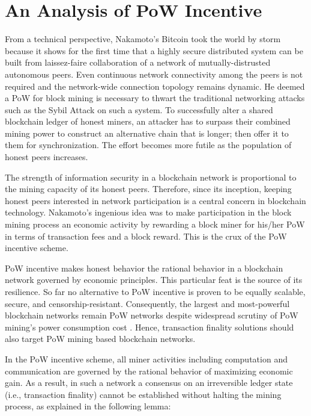 \section{An Analysis of PoW Incentive}
\label{s-incentive}
From a technical perspective, Nakamoto's Bitcoin \cite{bitcoin} took the world by storm because it shows for the first time that a highly secure distributed system can be built from laissez-faire collaboration of a network of mutually-distrusted autonomous peers. Even continuous network connectivity among the peers is not required and the network-wide connection topology remains dynamic. He deemed a PoW for block mining is necessary to thwart the traditional networking attacks such as the Sybil Attack \cite{Douceur:2002:SA:646334.687813} on such a system. To successfully alter a shared blockchain ledger of honest miners, an attacker has to surpass their combined mining power to construct an alternative chain that is longer; then offer it to them for synchronization. The effort becomes more futile as the population of honest peers increases.

The strength of information security in a blockchain network is proportional to the mining capacity of its honest peers. Therefore, since its inception, keeping honest peers interested in network participation is a central concern in blockchain technology. Nakamoto's ingenious idea was to make participation in the block mining process an economic activity \cite{Kroll2013TheEO} by rewarding a block miner for his/her PoW in terms of transaction fees and a block reward. This is the crux of the PoW incentive scheme.

PoW incentive makes honest behavior the rational behavior \cite{bitcoin} in a blockchain network governed by economic principles. This particular feat is the source of its resilience. So far no alternative to PoW incentive is proven to be equally scalable, secure, and censorship-resistant. Consequently, the largest and most-powerful blockchain networks remain PoW networks despite widespread scrutiny of PoW mining's power consumption cost \cite{powcost}. Hence, transaction finality solutions should also target PoW mining based blockchain networks.

In the PoW incentive scheme, all miner activities including computation and communication are governed by the rational behavior of maximizing economic gain. As a result, in such a network a consensus on an irreversible ledger state (i.e., transaction finality) cannot be established without halting the mining process, as explained in the following lemma:

